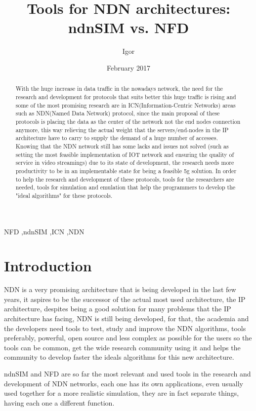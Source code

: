 \documentclass[preprint,12pt]{elsarticle}
\begin{document}
\begin{frontmatter}

\title{Tools for NDN architectures: ndnSIM vs. NFD}
\author{Igor}
\date{February 2017}
\address{Belem, Brazil}
\begin{abstract}
With the huge increase in data traffic in the nowadays network, the need for the research and development for protocols that suits better this huge traffic is rising and some of the most promising research are in ICN(Information-Centric Networks) areas such as NDN(Named Data Network) protocol, since the main proposal of these protocols is placing the data as the center of the network not the end nodes connection anymore, this way relieving the actual weight that the servers/end-nodes in the IP architecture have to carry to supply the demand of a huge number of accesses. Knowing that the NDN network still has some lacks and issues not solved (such as setting the most feasible implementation of IOT network and ensuring the quality of service in video streamings) due to its state of development, the research needs more productivity to be in an implementable state for being a feasible 5g solution. In order to help the research and development of these protocols, tools for the researchers are needed, tools for simulation and emulation that help the programmers to develop the "ideal algorithms" for these protocols.

\end{abstract}

\begin{keyword}
NFD \sep ndnSIM \sep ICN \sep NDN 


\end{keyword}
\end{frontmatter}
\section{Introduction}
\label{S:1}
   NDN is a very promising architecture that is being developed in the last few years, it aspires to be the successor of the actual most used architecture, the IP architecture, despites being a good solution for many problems that the IP architecture has facing, NDN is still being developed, for that, the academia and the developers need tools to test, study and improve the NDN algorithms, tools preferably, powerful, open source and less complex as possible for the users so the tools can be common, get the wide research community using it and helps the community to develop faster the ideals algorithms for this new architecture. \par
    ndnSIM and NFD are so far the most relevant and used tools in the research and development of NDN networks, each one has its own applications, even usually used together for a more realistic simulation, they are in fact separate things, having each one a different function.
\end{document}
